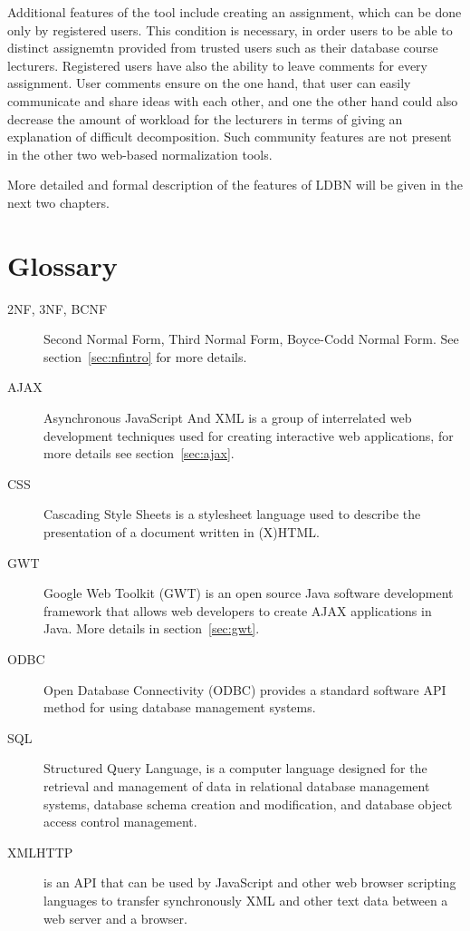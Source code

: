 Additional features of the tool include creating an assignment, which can be done 
only by registered users. This condition is necessary, in order users to be able 
to distinct assignemtn provided from trusted users such as their database course
lecturers. Registered users have also the ability to leave comments for every assignment.
User comments ensure on the one hand, that user can easily communicate and share ideas
with each other, and one the other hand could also decrease the amount of workload
for the lecturers in terms of giving an explanation of difficult decomposition.
Such community features are not present in the other two web-based 
normalization tools.

More detailed and formal description of the features of LDBN will be given in 
the next two chapters. 


\section{Glossary}
\begin{description}
	\item[2NF, 3NF, BCNF] Second Normal Form, Third Normal Form, Boyce-Codd Normal Form. See section~\ref{sec:nfintro} for more details.
	\item[AJAX] Asynchronous JavaScript And XML is a group of interrelated web development techniques used for creating interactive web applications, for more details see section~\ref{sec:ajax}.
	\item[CSS] Cascading Style Sheets is a stylesheet language used to describe the presentation of a document written in (X)HTML.
	\item[GWT] Google Web Toolkit (GWT) is an open source Java software development framework that allows web developers to create AJAX applications in Java. More details in section~\ref{sec:gwt}.
	\item[ODBC] Open Database Connectivity (ODBC) provides a standard software API method for using database management systems.
	\item[SQL] Structured Query Language, is a computer language designed for the retrieval and management of data in relational database management systems, database schema creation and modification, and database object access control management.
	\item[XMLHTTP] is an API that can be used by JavaScript and other web browser scripting languages to transfer synchronously XML and other text data between a web server and a browser.
\end{description}
